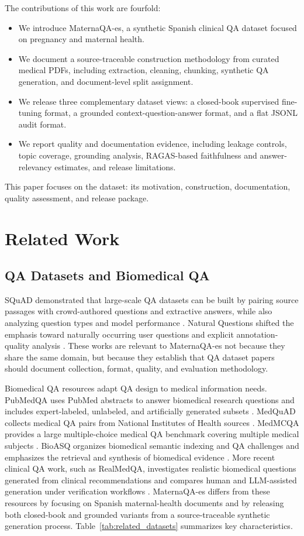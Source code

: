 \documentclass[conference]{IEEEtran}
\begin{document}
The contributions of this work are fourfold:
\begin{itemize}
    \item We introduce MaternaQA-es, a synthetic Spanish clinical QA dataset focused on pregnancy and maternal health.
    \item We document a source-traceable construction methodology from curated medical PDFs, including extraction, cleaning, chunking, synthetic QA generation, and document-level split assignment.
    \item We release three complementary dataset views: a closed-book supervised fine-tuning format, a grounded context-question-answer format, and a flat JSONL audit format.
    \item We report quality and documentation evidence, including leakage controls, topic coverage, grounding analysis, RAGAS-based faithfulness and answer-relevancy estimates, and release limitations.
\end{itemize}

This paper focuses on the dataset: its motivation, construction, documentation, quality assessment, and release package.

\section{Related Work}
\subsection{QA Datasets and Biomedical QA}
SQuAD demonstrated that large-scale QA datasets can be built by pairing source passages with crowd-authored questions and extractive answers, while also analyzing question types and model performance \cite{Rajpurkar2016SQuAD}. Natural Questions shifted the emphasis toward naturally occurring user questions and explicit annotation-quality analysis \cite{Kwiatkowski2019NaturalQuestions}. These works are relevant to MaternaQA-es not because they share the same domain, but because they establish that QA dataset papers should document collection, format, quality, and evaluation methodology.

Biomedical QA resources adapt QA design to medical information needs. PubMedQA uses PubMed abstracts to answer biomedical research questions and includes expert-labeled, unlabeled, and artificially generated subsets \cite{Jin2019PubMedQA}. MedQuAD collects medical QA pairs from National Institutes of Health sources \cite{Abacha2019MedQuAD}. MedMCQA provides a large multiple-choice medical QA benchmark covering multiple medical subjects \cite{Pal2022MedMCQA}. BioASQ organizes biomedical semantic indexing and QA challenges and emphasizes the retrieval and synthesis of biomedical evidence \cite{Tsatsaronis2015BioASQ}. More recent clinical QA work, such as RealMedQA, investigates realistic biomedical questions generated from clinical recommendations and compares human and LLM-assisted generation under verification workflows \cite{Kell2025RealMedQA}. MaternaQA-es differs from these resources by focusing on Spanish maternal-health documents and by releasing both closed-book and grounded variants from a source-traceable synthetic generation process. Table~\ref{tab:related_datasets} summarizes key characteristics.
\end{document}
